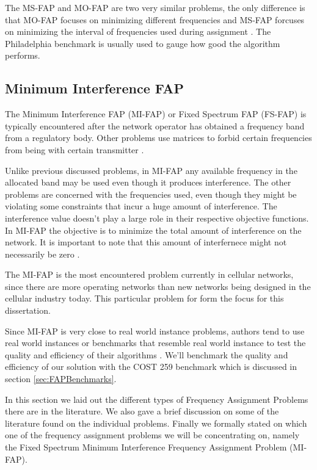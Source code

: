 The MS-FAP and MO-FAP are two very similar problems, the only difference is that MO-FAP focuses on minimizing different frequencies and MS-FAP forcuses on minimizing the interval of frequencies used during assignment \cite{Karen2004}. The Philadelphia benchmark is usually used to gauge how good the algorithm performs.
\subsection{Minimum Interference FAP}
The Minimum Interference FAP (MI-FAP) or Fixed Spectrum FAP (FS-FAP) is typically encountered after the network operator has obtained a frequency band from a regulatory body. Other problems use matrices to forbid certain frequencies from being with certain transmitter \cite{Karen2004,Eisenblatter,MontemanniThesis,MultipleBinaryFAP}. 

Unlike previous discussed problems, in MI-FAP any available frequency in the allocated band may be used even though it produces interference. The other problems are concerned with the frequencies used, even though they might be violating some constraints that incur a huge amount of interference. The interference value doesn't play a large role in their respective objective functions. In MI-FAP the objective is to minimize the total amount of interference on the network. It is important to note that this amount of interfernece might not necessarily be zero \cite{Karen2004,Eisenblatter,MontemanniThesis,MultipleBinaryFAP}.

The MI-FAP is the most encountered problem currently in cellular networks, since there are more operating networks than new networks being designed in the cellular industry today. This particular problem for form the focus for this dissertation. 

Since MI-FAP is very close to real world instance problems, authors tend to use real world instances or benchmarks that resemble real world instance to test the quality and efficiency of their algorithms \cite{Karen2004,Eisenblatter,MontemanniThesis,MultipleBinaryFAP}. We'll benchmark the quality and efficiency of our solution with the COST 259 benchmark which is discussed in section \ref{sec:FAPBenchmarks}.

In this section we laid out the different types of Frequency Assignment Problems there are in the literature. We also gave a brief discussion on some of the literature found on the individual problems. Finally we formally stated on which one of the frequency assignment problems we will be concentrating on, namely the Fixed Spectrum Minimum Interference Frequency Assignment Problem (MI-FAP). 


